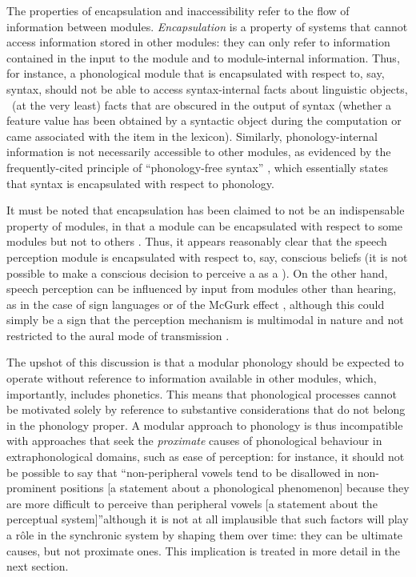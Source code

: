 The properties of encapsulation and inaccessibility refer to the flow of information between modules. \emph{Encapsulation} is a property of systems that cannot access information stored in other modules: they can only refer to information contained in the input to the module and to module\hyp internal information. Thus, for instance, a phonological module that is encapsulated with respect to, say, syntax, should not be able to access syntax\hyp internal facts about linguistic objects, \ie\ (at the very least) facts that are obscured in the output of syntax (\eg whether a feature value has been obtained by a syntactic object during the computation or came associated with the item in the lexicon). Similarly, phonology\hyp internal information is not necessarily accessible to other modules, as evidenced by the frequently\hyp cited principle of \enquote{phonology\hyp free syntax} \citep{zwicky69:_phonol,zwicky86:_princ_phonol_free_syntax,miller97:_princ_phonol_free_syntax}, which essentially states that syntax is encapsulated with respect to phonology.

It must be noted that encapsulation has been claimed to not be an indispensable property of modules, in that a module can be encapsulated with respect to some modules but not to others \citep[\cfm][]{prinz06:_is}. Thus, it appears reasonably clear that the speech perception module is encapsulated with respect to, say, conscious beliefs (\ie it is not possible to make a conscious decision to perceive a \ipa{[t]} as a \ipa{[w]}). On the other hand, speech perception can be influenced by input from modules other than hearing, as in the case of sign languages or of the McGurk effect \citep{mcgurk76:_hearin}, although this could simply be a sign that the perception mechanism is multimodal in nature and not restricted to the aural mode of transmission \citep{sep-modularity-mind}.

The upshot of this discussion is that a modular phonology should be expected to operate without reference to information available in other modules, which, importantly, includes phonetics. This means that phonological processes cannot be motivated solely by reference to substantive considerations that do not belong in the phonology proper. A modular approach to phonology is thus incompatible with approaches that seek the \emph{proximate} causes of phonological behaviour in extraphonological domains, such as ease of perception: for instance, it should not be possible to say that \enquote{non\hyp peripheral vowels tend to be disallowed in non\hyp prominent positions [a statement about a phonological phenomenon] because they are more difficult to perceive than peripheral vowels [a statement about the perceptual system]}\dash although it is not at all implausible that such factors will play a rôle in the synchronic system by shaping them over time: they can be ultimate causes, but not proximate ones. This implication is treated in more detail in the next section.

